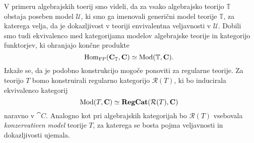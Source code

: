 \documentclass[../kategoricna_logika.tex]{subfiles}
\begin{document}
V primeru algebrajskih toerij smo videli, da za vsako algebrajsko teorijo $\mathbb{T}$ obstaja poseben model $\mathcal{U}$,
ki smo ga imenovali generični model teorije $\mathbb{T}$, za katerega velja, da je dokazljivost v teoriji envivalentna veljavnosti v $\mathcal{U}$.
Dobili smo tudi ekvivalenco med kategorijama modelov algebrajske teorije in kategorijo funktorjev, ki ohranjajo končne produkte
$$\operatorname{Hom}_{\mathrm{FP}}({\operatorname{\mathbf{C}}}_{\mathbb{T}}, {\operatorname{\mathbf{C}}}) \simeq \operatorname{Mod}(\mathbb{T}, {\operatorname{\mathbf{C}}}).$$
Izkaže se, da je podobno konstrukcijo mogoče ponoviti za regularne teorije.
Za teorijo $T$ bomo konstruirali regularno kategorijo $\mathcal{R}(T)$, ki bo inducirala ekvivalenco kategorij
$$\operatorname{Mod}(T, {\operatorname{\mathbf{C}}}) \simeq {\operatorname{\mathbf{RegCat}}}(\mathcal{R}(T), {\operatorname{\mathbf{C}}})$$
naravno v $\cat{C}$. Analogno kot pri algebrajskih kategorijah bo $\mathcal{R}(T)$ vsebovala \emph{konzervativen model} teorije $T$,
za katerega se bosta pojma veljavnosti in dokazljivosti ujemala.
\end{document}
